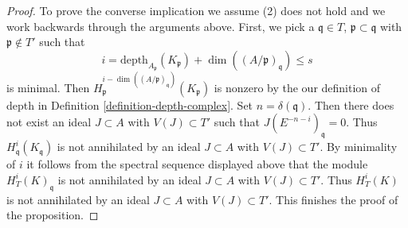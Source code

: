 \begin{proof}
\medskip\noindent
To prove the converse implication we assume (2) does not hold
and we work backwards through the arguments above. First, we pick a
$\mathfrak q \in T$, $\mathfrak p \subset \mathfrak q$
with $\mathfrak p \not \in T'$ such that
$$
i = \text{depth}_{A_\mathfrak p}(K_\mathfrak p) +
\dim((A/\mathfrak p)_\mathfrak q) \leq s
$$
is minimal. Then
$H^{i - \dim((A/\mathfrak p)_\mathfrak q)}_\mathfrak p(K_\mathfrak p)$
is nonzero by the our definition of depth in
Definition \ref{definition-depth-complex}.
Set $n = \delta(\mathfrak q)$. Then
there does not exist an ideal $J \subset A$ with $V(J) \subset T'$
such that $J(E^{-n - i})_\mathfrak q = 0$.
Thus $H^i_\mathfrak q(K_\mathfrak q)$ is not
annihilated by an ideal $J \subset A$ with $V(J) \subset T'$.
By minimality of $i$ it follows from the spectral sequence displayed above
that the module $H^i_T(K)_\mathfrak q$
is not annihilated by an ideal $J \subset A$
with $V(J) \subset T'$. Thus $H^i_T(K)$
is not annihilated by an ideal $J \subset A$
with $V(J) \subset T'$. This finishes the proof of the proposition.
\end{proof}
